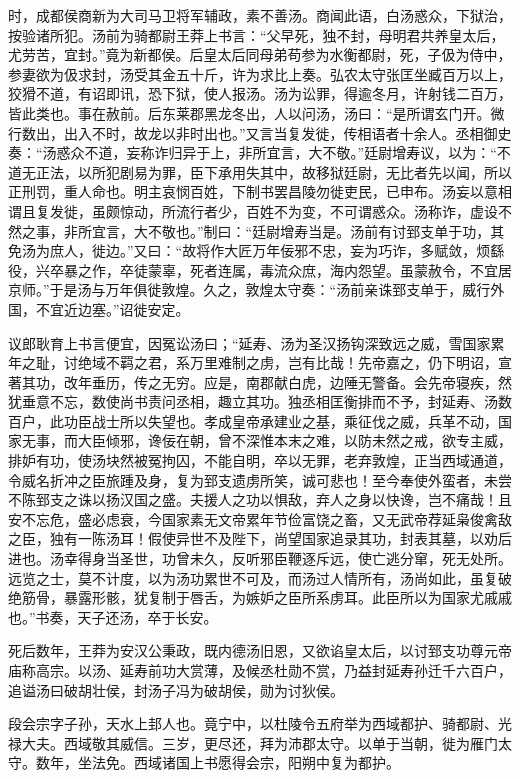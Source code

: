 \documentclass[]{article}
\begin{document}
时，成都侯商新为大司马卫将军辅政，素不善汤。商闻此语，白汤惑众，下狱治，按验诸所犯。汤前为骑都尉王莽上书言：``父早死，独不封，母明君共养皇太后，尤劳苦，宜封。''竟为新都侯。后皇太后同母弟苟参为水衡都尉，死，子伋为侍中，参妻欲为伋求封，汤受其金五十斤，许为求比上奏。弘农太守张匡坐臧百万以上，狡猾不道，有诏即讯，恐下狱，使人报汤。汤为讼罪，得逾冬月，许射钱二百万，皆此类也。事在赦前。后东莱郡黑龙冬出，人以问汤，汤曰：``是所谓玄门开。微行数出，出入不时，故龙以非时出也。''又言当复发徙，传相语者十余人。丞相御史奏：``汤惑众不道，妄称诈归异于上，非所宜言，大不敬。''廷尉增寿议，以为：``不道无正法，以所犯剧易为罪，臣下承用失其中，故移狱廷尉，无比者先以闻，所以正刑罚，重人命也。明主哀悯百姓，下制书罢昌陵勿徙吏民，已申布。汤妄以意相谓且复发徙，虽颇惊动，所流行者少，百姓不为变，不可谓惑众。汤称诈，虚设不然之事，非所宜言，大不敬也。''制曰：``廷尉增寿当是。汤前有讨郅支单于功，其免汤为庶人，徙边。''又曰：``故将作大匠万年佞邪不忠，妄为巧诈，多赋敛，烦繇役，兴卒暴之作，卒徒蒙辜，死者连属，毒流众庶，海内怨望。虽蒙赦令，不宜居京师。''于是汤与万年俱徙敦煌。久之，敦煌太守奏：``汤前亲诛郅支单于，威行外国，不宜近边塞。''诏徙安定。

议郎耿育上书言便宜，因冤讼汤曰；``延寿、汤为圣汉扬钩深致远之威，雪国家累年之耻，讨绝域不羁之君，系万里难制之虏，岂有比哉！先帝嘉之，仍下明诏，宣著其功，改年垂历，传之无穷。应是，南郡献白虎，边陲无警备。会先帝寝疾，然犹垂意不忘，数使尚书责问丞相，趣立其功。独丞相匡衡排而不予，封延寿、汤数百户，此功臣战士所以失望也。孝成皇帝承建业之基，乘征伐之威，兵革不动，国家无事，而大臣倾邪，谗佞在朝，曾不深惟本末之难，以防未然之戒，欲专主威，排妒有功，使汤块然被冤拘囚，不能自明，卒以无罪，老弃敦煌，正当西域通道，令威名折冲之臣旅踵及身，复为郅支遗虏所笑，诚可悲也！至今奉使外蛮者，未尝不陈郅支之诛以扬汉国之盛。夫援人之功以惧敌，弃人之身以快谗，岂不痛哉！且安不忘危，盛必虑衰，今国家素无文帝累年节俭富饶之畜，又无武帝荐延枭俊禽敌之臣，独有一陈汤耳！假使异世不及陛下，尚望国家追录其功，封表其墓，以劝后进也。汤幸得身当圣世，功曾未久，反听邪臣鞭逐斥远，使亡逃分窜，死无处所。远览之士，莫不计度，以为汤功累世不可及，而汤过人情所有，汤尚如此，虽复破绝筋骨，暴露形骸，犹复制于唇舌，为嫉妒之臣所系虏耳。此臣所以为国家尤戚戚也。''书奏，天子还汤，卒于长安。

死后数年，王莽为安汉公秉政，既内德汤旧恩，又欲谄皇太后，以讨郅支功尊元帝庙称高宗。以汤、延寿前功大赏薄，及候丞杜勋不赏，乃益封延寿孙迁千六百户，追谥汤曰破胡壮侯，封汤子冯为破胡侯，勋为讨狄侯。

段会宗字子孙，天水上邽人也。竟宁中，以杜陵令五府举为西域都护、骑都尉、光禄大夫。西域敬其威信。三岁，更尽还，拜为沛郡太守。以单于当朝，徙为雁门太守。数年，坐法免。西域诸国上书愿得会宗，阳朔中复为都护。
\end{document}
